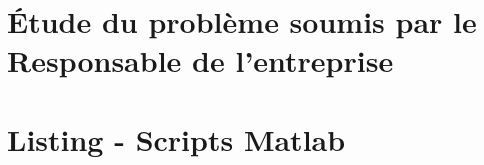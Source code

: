 \documentclass[paper=a4, fontsize=11pt]{scrartcl}
\numberwithin{equation}{section}		%
\numberwithin{figure}{section}			%
\numberwithin{table}{section}				%
\begin{document}
\section{\'Etude du problème soumis par le Responsable de l'entreprise}

\newpage

\section{Listing - Scripts Matlab}

\lstlistoflistings







\end{document}

